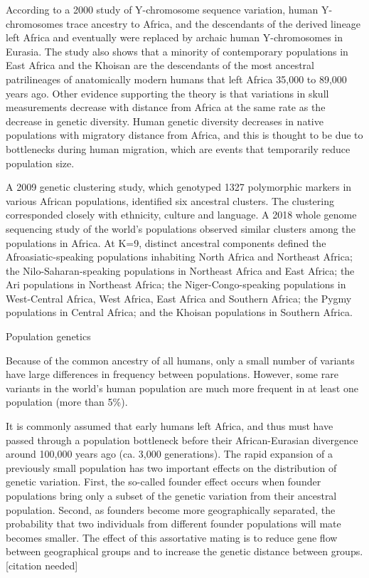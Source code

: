 According to a 2000 study of Y-chromosome sequence variation, human Y-chromosomes trace ancestry to Africa, and the descendants of the derived lineage left Africa and eventually were replaced by archaic human Y-chromosomes in Eurasia. The study also shows that a minority of contemporary populations in East Africa and the Khoisan are the descendants of the most ancestral patrilineages of anatomically modern humans that left Africa 35,000 to 89,000 years ago. Other evidence supporting the theory is that variations in skull measurements decrease with distance from Africa at the same rate as the decrease in genetic diversity. Human genetic diversity decreases in native populations with migratory distance from Africa, and this is thought to be due to bottlenecks during human migration, which are events that temporarily reduce population size.

A 2009 genetic clustering study, which genotyped 1327 polymorphic markers in various African populations, identified six ancestral clusters. The clustering corresponded closely with ethnicity, culture and language. A 2018 whole genome sequencing study of the world's populations observed similar clusters among the populations in Africa. At K=9, distinct ancestral components defined the Afroasiatic-speaking populations inhabiting North Africa and Northeast Africa; the Nilo-Saharan-speaking populations in Northeast Africa and East Africa; the Ari populations in Northeast Africa; the Niger-Congo-speaking populations in West-Central Africa, West Africa, East Africa and Southern Africa; the Pygmy populations in Central Africa; and the Khoisan populations in Southern Africa.

Population genetics

Because of the common ancestry of all humans, only a small number of variants have large differences in frequency between populations. However, some rare variants in the world's human population are much more frequent in at least one population (more than 5\%).

It is commonly assumed that early humans left Africa, and thus must have passed through a population bottleneck before their African-Eurasian divergence around 100,000 years ago (ca. 3,000 generations). The rapid expansion of a previously small population has two important effects on the distribution of genetic variation. First, the so-called founder effect occurs when founder populations bring only a subset of the genetic variation from their ancestral population. Second, as founders become more geographically separated, the probability that two individuals from different founder populations will mate becomes smaller. The effect of this assortative mating is to reduce gene flow between geographical groups and to increase the genetic distance between groups.{[}citation needed{]}

